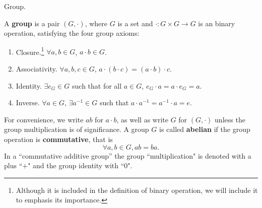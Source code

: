 \documentclass[../../book.tex]{subfiles}
\begin{document}
\begin{dfn} Group. 

A \textbf{group} is a pair $(G, \cdot)$, where $G$ is a set and $\cdot : G\times G \rightarrow G$ is an binary operation, satisfying the four group axioms:
\begin{enumerate}
\item Closure.\footnote{Although it is included in the definition of binary operation, we will include it to emphasis its importance.}  $ \forall a,b\in G$, $a\cdot b \in G$.
\item Associativity. $ \forall a,b,c\in G$, $a \cdot (b \cdot c) = (a \cdot b) \cdot c$.
\item Identity. $ \exists e_G \in G$ such that for all $a \in G$, 
$e_G \cdot a = a \cdot e_G=a$.
\item Inverse. $ \forall a\in G$,  $ \exists a^{-1} \in G$ such that $a \cdot a^{-1} = a^{-1} \cdot a = e$.
\end{enumerate}
For convenience, we write $ab$ for $a \cdot b$, 
as well as write $G$ for $(G,\cdot)$ 
unless the group multiplication is of significance. 
A group $G$ is called \textbf{abelian} 
if the group operation is \textbf{commutative}, that is
\[\forall a, b \in G, ab = ba.\]
In a ``commutative additive group'' the group 
``multiplication" is denoted with a plus ``$+$"
and the group identity with ``$0$".

\end{dfn}
\end{document}
